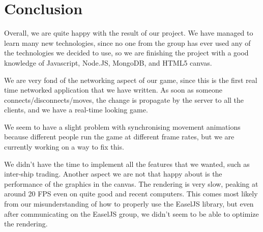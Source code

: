 \documentclass[a4paper,11pt]{article}
\begin{document}
	\section{Conclusion}
	
	Overall, we are quite happy with the result of our project. We have managed to learn many new technologies, since no one from the group has ever used any of the technologies we decided to use, so we are finishing the project with a good knowledge of Javascript, Node.JS, MongoDB, and HTML5 canvas.
	
	We are very fond of the networking aspect of our game, since this is the first real time networked application that we have written. As soon as someone connects/disconnects/moves, the change is propagate by the server to all the clients, and we have a real-time looking game. 
	
	We seem to have a slight problem with synchronising movement animations because different people run the game at different frame rates, but we are currently working on a way to fix this.
	
	We didn't have the time to implement all the features that we wanted, such as inter-ship trading. Another aspect we are not that happy about is the performance of the graphics in the canvas. The rendering is very slow, peaking at around 20 FPS even on quite good and recent computers. This comes most likely from our misunderstanding of how to properly use the EaselJS library, but even after communicating on the EaselJS group, we didn't seem to be able to optimize the rendering.
	
	
	
\end{document}
